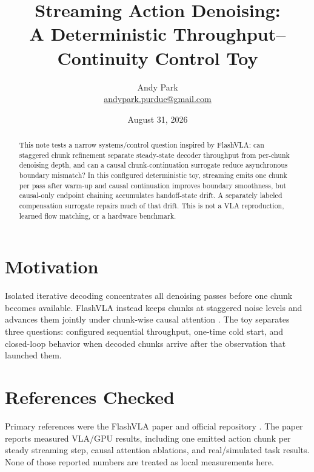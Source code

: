 \documentclass[11pt]{article}
\title{Streaming Action Denoising:\\A Deterministic Throughput--Continuity Control Toy}
\author{Andy Park\\\href{mailto:andypark.purdue@gmail.com}{andypark.purdue@gmail.com}}
\date{August 31, 2026}
\begin{document}
\setlength{\emergencystretch}{3em}
\maketitle

\begin{abstract}
This note tests a narrow systems/control question inspired by FlashVLA: can staggered chunk refinement separate steady-state decoder throughput from per-chunk denoising depth, and can a causal chunk-continuation surrogate reduce asynchronous boundary mismatch? In this configured deterministic toy, streaming emits one chunk per pass after warm-up and causal continuation improves boundary smoothness, but causal-only endpoint chaining accumulates handoff-state drift. A separately labeled compensation surrogate repairs much of that drift. This is not a VLA reproduction, learned flow matching, or a hardware benchmark.
\end{abstract}

\section{Motivation}
Isolated iterative decoding concentrates all denoising passes before one chunk becomes available. FlashVLA instead keeps chunks at staggered noise levels and advances them jointly under chunk-wise causal attention \cite{primary,code}. The toy separates three questions: configured sequential throughput, one-time cold start, and closed-loop behavior when decoded chunks arrive after the observation that launched them.

\section{References Checked}
Primary references were the FlashVLA paper \cite{primary} and official repository \cite{code}. The paper reports measured VLA/GPU results, including one emitted action chunk per steady streaming step, causal attention ablations, and real/simulated task results. None of those reported numbers are treated as local measurements here.
\end{document}

